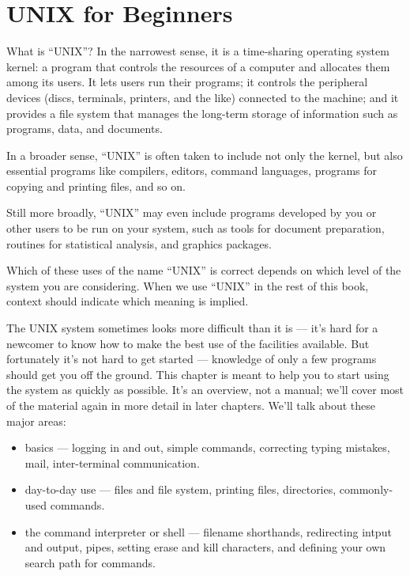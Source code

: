 \chapter{UNIX for Beginners}


What is ``UNIX''? In the narrowest sense, it is a time-sharing operating system
kernel: a program that controls the resources of a computer and allocates them
among its users. It lets users run their programs; it controls the peripheral
devices (discs, terminals, printers, and the like) connected to the machine; and
it provides a file system that manages the long-term storage of information such
as programs, data, and documents.

In a broader sense, ``UNIX'' is often taken to include not only the kernel, but
also essential programs like compilers, editors, command languages, programs for
copying and printing files, and so on.

Still more broadly, ``UNIX'' may even include programs developed by you or other
users to be run on your system, such as tools for document preparation, routines
for statistical analysis, and graphics packages.

Which of these uses of the name ``UNIX'' is correct depends on which level of
the system you are considering. When we use ``UNIX'' in the rest of this book,
context should indicate which meaning is implied.

The UNIX system sometimes looks more difficult than it is --- it's hard for a
newcomer to know how to make the best use of the facilities available. But
fortunately it's not hard to get started --- knowledge of only a few programs
should get you off the ground. This chapter is meant to help you to start using
the system as quickly as possible. It's an overview, not a manual; we'll cover
most of the material again in more detail in later chapters. We'll talk about
these major areas:

\begin{itemize}
\item basics --- logging in and out, simple commands, correcting typing
  mistakes, mail, inter-terminal communication.
\item day-to-day use --- files and file system, printing files, directories,
  commonly-used commands.
\item the command interpreter or shell --- filename shorthands, redirecting
  intput and output, pipes, setting erase and kill characters, and defining your
  own search path for commands.
\end{itemize}

